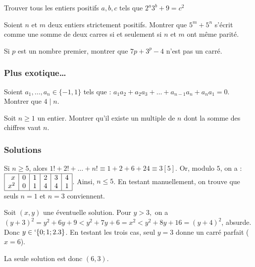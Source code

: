 \begin{exo}
Trouver tous les entiers positifs $a,b,c$ tels que $2^a3^b+9=c^2$
\end{exo}


\begin{exo}
Soient $n$ et $m$ deux entiers strictement positifs. Montrer que $5^m + 5^n$ s’écrit comme une
somme de deux carres si et seulement si $n$ et $m$ ont même parité.
\end{exo}



\begin{exo} Si $p$ est un nombre premier, montrer que $7p+3^p-4$ n'est pas un carré.
\end{exo}


\subsubsection{Plus exotique…}

\begin{exo} Soient $a_1,\dots,a_n \in \{-1,1\}$ tels que : $a_1a_2+a_2a_3+\dots+a_{n-1}a_n+a_na_1=0$.
Montrer que $4\mid n$.
\end{exo}


\begin{exo}
Soit $n\ge1$ un entier. Montrer qu'il existe un multiple de $n$ dont la somme des chiffres vaut $n$.
\end{exo}


\subsubsection{Solutions}


\begin{sol} Si $n\geq5$, alors $ 1!+2!+\ldots+n!\equiv 1+2+6+24\equiv 3 [5]$.
Or, modulo $5$, on a : $\begin{array}{|r|c|c|c|c|l|}
\hline
x & 0 & 1 & 2 & 3 & 4 \\
x^2 & 0 & 1 & 4 & 4 & 1 \\
\hline
\end{array}$. Ainsi, $n\leq5$. En testant manuellement, on trouve que seuls $n=1$ et $n=3$ conviennent.
\end{sol}

\begin{sol}
Soit $(x,y)$ une éventuelle solution.
Pour $y>3,$ on a $(y+3)^2=y^2+6y+9<y^2+7y+6=x^2<y^2+8y+16=(y+4)^2$, absurde.
Donc $y\in`\{0;1;2.3\}$. En testant les trois cas, seul $y=3$ donne un carré parfait ($x=6$).

La seule solution est donc $(6,3)$.
\end{sol}


